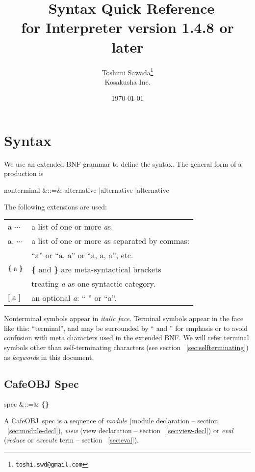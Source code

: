 \documentclass[a4paper]{article}
\title{\cafeobj\ Syntax Quick Reference \\
  {\small for Interpreter version 1.4.8 or later}}
\date{\today}
\author{Toshimi Sawada\thanks{\texttt{toshi.swd@gmail.com}} \\
  Kosakusha Inc.
  }
\newenvironment{fminipage}%
{\begin{Sbox}\begin{minipage}}%
{\end{minipage}\end{Sbox}\fbox{\TheSbox}}
\def\cafeobj{\textsf{CafeOBJ}}
\def\sym#1{\textsf{#1}\null}
\def\nonterm#1{\textit{#1}\null}
\def\alt{{\;|\;}}
\def\seqof#1{\mbox{\textbf{\{}}\;{#1}\;\mbox{\textbf{\}}}}
\def\optn#1{\textbf{[}\;{#1}\;\textbf{]}}
\def\synindent{\;\;\;}
\begin{document}
\maketitle
\tableofcontents
%
\setlength{\parindent}{0pt}
\setlength{\parskip}{1.4ex}
\section{Syntax}
\label{sec:cafeobj-syntax}

We use an extended BNF grammar to define the syntax. The general form
of a production is
\begin{syntax}
\synindent\synindent  nonterminal &::=& alternative \alt alternative \alt \cdots \alt alternative
\end{syntax}

The following extensions are used:
\begin{center}
\begin{fminipage}{0.7\textwidth}
  \begin{tabular}{ll}
    a $\cdots$ & a list of one or more \textit{a}s. \\
    a, $\cdots$ & a list of one or more \textit{a}s separated by commas: \\
    & ``a'' or ``a, a'' or ``a, a, a'', etc. \\
    $\seqof{\textrm{a}}$ & \textbf{\{} and \textbf{\}} are meta-syntactical
    brackets \\ 
    & treating \textit{a} as one syntactic category. \\
    $\optn{\textrm{a}}$ & an optional \textit{a}: `` '' or ``a''.
  \end{tabular}
\end{fminipage}
\end{center}
Nonterminal symbols appear in \textit{italic face}. Terminal symbols
appear in the face like this: ``\sym{terminal}'', and may be
surrounded by `` and '' for emphasis or to avoid confusion
with meta characters used in the extended BNF. We will refer terminal
symbols other than self-terminating characters (see section
~\ref{sec:selfterminating}) as \textit{keyword}s in this document.

\subsection{CafeOBJ Spec}
\label{sec:cafeobjprogram}
\begin{syntax}
  \synindent\synindent spec &::=& \seqof{module \alt view \alt eval} \cdots
\end{syntax}
A \cafeobj\ spec is a sequence of \nonterm{module} (module declaration
-- section ~\ref{sec:module-decl}), \nonterm{view} (view declaration -- 
section ~\ref{sec:view-decl}) or \nonterm{eval} (\textit{reduce} or
\textit{execute} term -- section ~\ref{sec:eval}).
\end{document}
